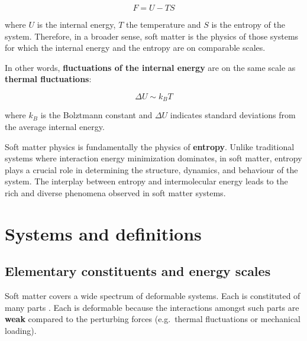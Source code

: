 \documentclass[
  letterpaper,
  enabledeprecatedfontcommands]{report}
\begin{document}
\[F = U-TS\]

where \(U\) is the internal energy, \(T\) the temperature and \(S\) is
the entropy of the system. Therefore, in a broader sense, soft matter is
the physics of those systems for which the internal energy and the
entropy are on comparable scales.

In other words, \textbf{fluctuations of the internal energy} are on the
same scale as \textbf{thermal fluctuations}:

\[\Delta U \sim k_BT \]

where \(k_B\) is the Bolztmann constant and \(\Delta U\) indicates
standard deviations from the average internal energy.

\begin{tcolorbox}[enhanced jigsaw, toprule=.15mm, opacityback=0, colbacktitle=quarto-callout-note-color!10!white, title=\textcolor{quarto-callout-note-color}{\faInfo}\hspace{0.5em}{The Physics of Entropy}, leftrule=.75mm, rightrule=.15mm, bottomtitle=1mm, breakable, colframe=quarto-callout-note-color-frame, colback=white, toptitle=1mm, left=2mm, titlerule=0mm, coltitle=black, arc=.35mm, bottomrule=.15mm, opacitybacktitle=0.6]

Soft matter physics is fundamentally the physics of \textbf{entropy}.
Unlike traditional systems where interaction energy minimization
dominates, in soft matter, entropy plays a crucial role in determining
the structure, dynamics, and behaviour of the system. The interplay
between entropy and intermolecular energy leads to the rich and diverse
phenomena observed in soft matter systems.

\end{tcolorbox}

\section{Systems and definitions}\label{systems-and-definitions}

\subsection{Elementary constituents and energy
scales}\label{elementary-constituents-and-energy-scales}

Soft matter covers a wide spectrum of deformable systems. Each is
constituted of many parts . Each is deformable because the interactions
amongst such parts are \textbf{weak} compared to the perturbing forces
(e.g.~thermal fluctuations or mechanical loading).
\end{document}
